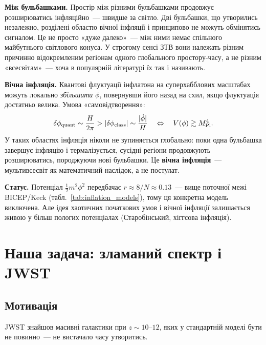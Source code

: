 \documentclass[12pt, a4paper]{article}
\begin{document}
\textbf{Між бульбашками.} Простір між різними бульбашками
продовжує розширюватись інфляційно~--- швидше за світло.
Дві бульбашки, що утворились незалежно, розділені областю
вічної інфляції і принципово не можуть обмінятись сигналом.
Це не просто «дуже далеко»~--- між ними немає спільного
майбутнього світлового конуса. У строгому сенсі ЗТВ вони
належать різним причинно відокремленим регіонам
одного глобального простору-часу, а не різним «всесвітам»~---
хоча в популярній літературі їх так і називають.

\textbf{Вічна інфляція.} Квантові флуктуації інфлатона на
суперхабблових масштабах можуть локально \emph{збільшити} $\phi$,
повернувши його назад на схил, якщо флуктуація достатньо велика.
Умова «самовідтворення»:
\begin{equation*}
  \delta\phi_{\rm quant} \sim \frac{H}{2\pi}
  > |\delta\phi_{\rm class}| \sim \frac{|\dot\phi|}{H}
  \quad\Leftrightarrow\quad
  V(\phi) \gtrsim M_{\rm Pl}^4.
\end{equation*}
У таких областях інфляція ніколи не зупиняється глобально:
поки одна бульбашка завершує інфляцію і термалізується,
сусідні регіони продовжують розширюватись, породжуючи нові
бульбашки. Це \textbf{вічна інфляція}~--- мультивсесвіт
як математичний наслідок, а не постулат.

\textbf{Статус.} Потенціал $\tfrac{1}{2}m^2\phi^2$ передбачає
$r \approx 8/N \approx 0.13$~--- вище поточної межі BICEP/Keck
(табл.~\ref{tab:inflation_models}), тому ця конкретна модель
виключена. Але ідея хаотичних початкових умов і вічної інфляції
залишається живою у більш пологих потенціалах (Старобінський,
хіггсова інфляція).


\section{Наша задача: зламаний спектр і JWST}
\label{sec:broken}

\subsection{Мотивація}

JWST знайшов масивні галактики при $z \sim 10$--$12$, яких у стандартній
моделі бути не повинно~--- не вистачало часу утворитись.
\end{document}
